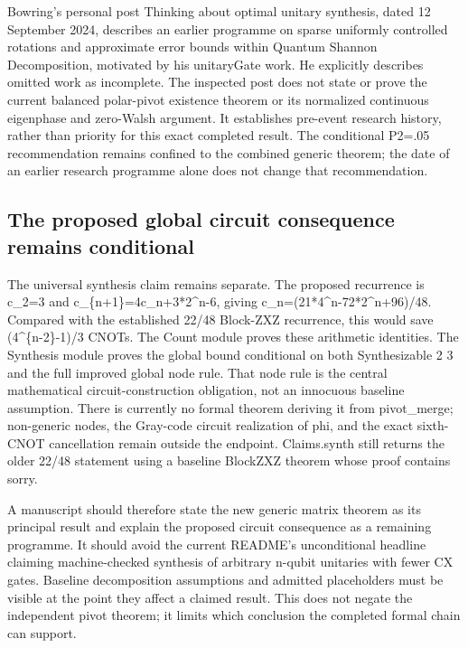 \documentclass[11pt,a4paper]{article}
\begin{document}
Bowring's personal post Thinking about optimal unitary synthesis, dated 12 September 2024, describes an earlier programme on sparse uniformly controlled rotations and approximate error bounds within Quantum Shannon Decomposition, motivated by his unitaryGate work. He explicitly describes omitted work as incomplete. The inspected post does not state or prove the current balanced polar-pivot existence theorem or its normalized continuous eigenphase and zero-Walsh argument. It establishes pre-event research history, rather than priority for this exact completed result. The conditional P2=.05 recommendation remains confined to the combined generic theorem; the date of an earlier research programme alone does not change that recommendation.

\subsection{The proposed global circuit consequence remains conditional}
The universal synthesis claim remains separate. The proposed recurrence is c\_2=3 and c\_\{n+1\}=4c\_n+3*2\textasciicircum{}n-6, giving c\_n=(21*4\textasciicircum{}n-72*2\textasciicircum{}n+96)/48. Compared with the established 22/48 Block-ZXZ recurrence, this would save (4\textasciicircum{}\{n-2\}-1)/3 CNOTs. The Count module proves these arithmetic identities. The Synthesis module proves the global bound conditional on both Synthesizable 2 3 and the full improved global node rule. That node rule is the central mathematical circuit-construction obligation, not an innocuous baseline assumption. There is currently no formal theorem deriving it from pivot\_merge; non-generic nodes, the Gray-code circuit realization of phi, and the exact sixth-CNOT cancellation remain outside the endpoint. Claims.synth still returns the older 22/48 statement using a baseline BlockZXZ theorem whose proof contains sorry.

A manuscript should therefore state the new generic matrix theorem as its principal result and explain the proposed circuit consequence as a remaining programme. It should avoid the current README's unconditional headline claiming machine-checked synthesis of arbitrary n-qubit unitaries with fewer CX gates. Baseline decomposition assumptions and admitted placeholders must be visible at the point they affect a claimed result. This does not negate the independent pivot theorem; it limits which conclusion the completed formal chain can support.
\end{document}
